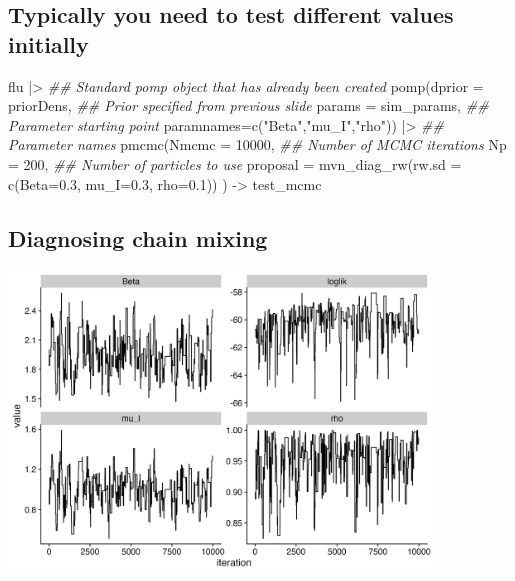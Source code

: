 \documentclass[
  letterpaper,
  DIV=11,
  numbers=noendperiod]{scrartcl}
\newenvironment{Shaded}{\begin{snugshade}}{\end{snugshade}}
\newcommand{\AttributeTok}[1]{\textcolor[rgb]{0.40,0.45,0.13}{#1}}
\newcommand{\DecValTok}[1]{\textcolor[rgb]{0.68,0.00,0.00}{#1}}
\newcommand{\DocumentationTok}[1]{\textcolor[rgb]{0.37,0.37,0.37}{\textit{#1}}}
\newcommand{\FloatTok}[1]{\textcolor[rgb]{0.68,0.00,0.00}{#1}}
\newcommand{\FunctionTok}[1]{\textcolor[rgb]{0.28,0.35,0.67}{#1}}
\newcommand{\NormalTok}[1]{\textcolor[rgb]{0.00,0.23,0.31}{#1}}
\newcommand{\OtherTok}[1]{\textcolor[rgb]{0.00,0.23,0.31}{#1}}
\newcommand{\SpecialCharTok}[1]{\textcolor[rgb]{0.37,0.37,0.37}{#1}}
\newcommand{\StringTok}[1]{\textcolor[rgb]{0.13,0.47,0.30}{#1}}
\begin{document}
\hypertarget{typically-you-need-to-test-different-values-initially}{%
\subsection{Typically you need to test different values
initially}\label{typically-you-need-to-test-different-values-initially}}

\begin{Shaded}
\begin{Highlighting}[]
\NormalTok{flu }\SpecialCharTok{|\textgreater{}} \DocumentationTok{\#\# Standard pomp object that has already been created }
  \FunctionTok{pomp}\NormalTok{(}\AttributeTok{dprior =}\NormalTok{ priorDens, }\DocumentationTok{\#\# Prior specified from previous slide}
       \AttributeTok{params =}\NormalTok{ sim\_params, }\DocumentationTok{\#\# Parameter starting point}
       \AttributeTok{paramnames=}\FunctionTok{c}\NormalTok{(}\StringTok{"Beta"}\NormalTok{,}\StringTok{"mu\_I"}\NormalTok{,}\StringTok{"rho"}\NormalTok{)) }\SpecialCharTok{|\textgreater{}} \DocumentationTok{\#\# Parameter names}
  \FunctionTok{pmcmc}\NormalTok{(}\AttributeTok{Nmcmc =} \DecValTok{10000}\NormalTok{, }\DocumentationTok{\#\# Number of MCMC iterations}
        \AttributeTok{Np =} \DecValTok{200}\NormalTok{, }\DocumentationTok{\#\# Number of particles to use}
        \AttributeTok{proposal =} \FunctionTok{mvn\_diag\_rw}\NormalTok{(}\AttributeTok{rw.sd =} \FunctionTok{c}\NormalTok{(}\AttributeTok{Beta=}\FloatTok{0.3}\NormalTok{, }\AttributeTok{mu\_I=}\FloatTok{0.3}\NormalTok{, }\AttributeTok{rho=}\FloatTok{0.1}\NormalTok{))}
\NormalTok{  ) }\OtherTok{{-}\textgreater{}}\NormalTok{ test\_mcmc}
\end{Highlighting}
\end{Shaded}

\hypertarget{diagnosing-chain-mixing}{%
\subsection{Diagnosing chain mixing}\label{diagnosing-chain-mixing}}

\begin{center}
  \includegraphics[height=8cm]{../graphics/test-mcmc-trace.png}
\end{center}
\end{document}
